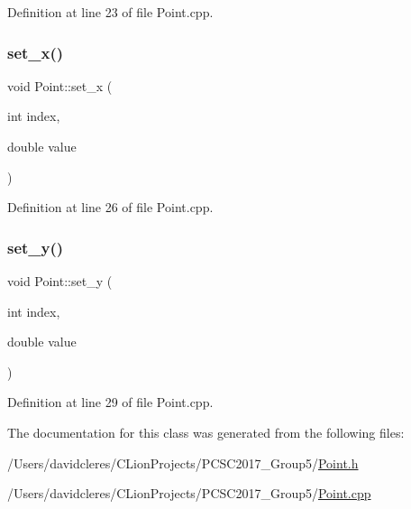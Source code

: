 Definition at line 23 of file Point.\+cpp.

\mbox{\label{class_point_a0e06062c8608e039f214cd0815634aa2}} 
\subsubsection{\texorpdfstring{set\+\_\+x()}{set\_x()}}
{\footnotesize\ttfamily void Point\+::set\+\_\+x (\begin{DoxyParamCaption}\item[{int}]{index,  }\item[{double}]{value }\end{DoxyParamCaption})}



Definition at line 26 of file Point.\+cpp.

\mbox{\label{class_point_a140e7315cdb4c66f1230df7e7b92ffa5}} 
\subsubsection{\texorpdfstring{set\+\_\+y()}{set\_y()}}
{\footnotesize\ttfamily void Point\+::set\+\_\+y (\begin{DoxyParamCaption}\item[{int}]{index,  }\item[{double}]{value }\end{DoxyParamCaption})}



Definition at line 29 of file Point.\+cpp.



The documentation for this class was generated from the following files\+:\begin{DoxyCompactItemize}
\item 
/\+Users/davidcleres/\+C\+Lion\+Projects/\+P\+C\+S\+C2017\+\_\+\+Group5/\mbox{\hyperlink{_point_8h}{Point.\+h}}\item 
/\+Users/davidcleres/\+C\+Lion\+Projects/\+P\+C\+S\+C2017\+\_\+\+Group5/\mbox{\hyperlink{_point_8cpp}{Point.\+cpp}}\end{DoxyCompactItemize}
